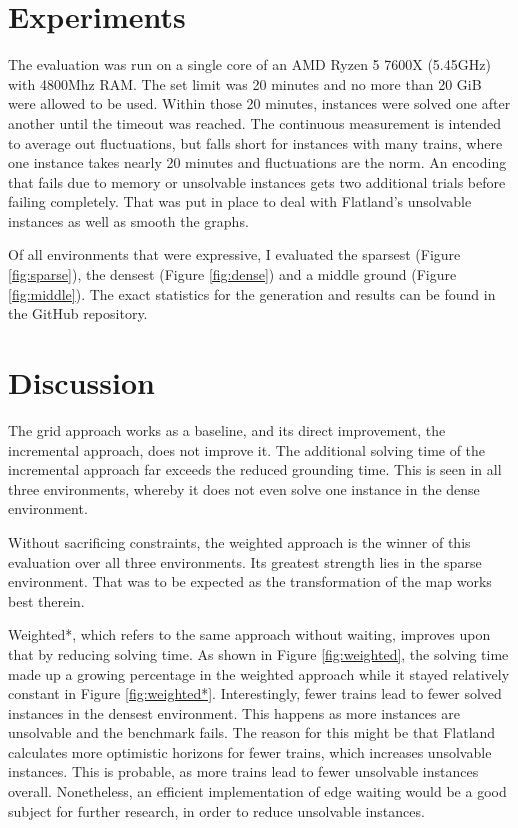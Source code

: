\documentclass{llncs}
\begin{document}
\begin{multicols*}{2}
\section*{Experiments}
The evaluation was run on a single core of an AMD Ryzen 5 7600X (5.45GHz) with 4800Mhz RAM. The set limit was 20 minutes and no more than 20 GiB were allowed to be used. Within those 20 minutes, instances were solved one after another until the timeout was reached. The continuous measurement is intended to average out fluctuations, but falls short for instances with many trains, where one instance takes nearly 20 minutes and fluctuations are the norm. An encoding that fails due to memory or unsolvable instances gets two additional trials before failing completely. That was put in place to deal with Flatland's unsolvable instances as well as smooth the graphs.

Of all environments that were expressive, I evaluated the sparsest (Figure \ref{fig:sparse}), the densest (Figure \ref{fig:dense}) and a middle ground (Figure \ref{fig:middle}). The exact statistics for the generation and results can be found in the GitHub repository. \cite{Git24}\\

\section*{Discussion}
The grid approach works as a baseline, and its direct improvement, the incremental approach, does not improve it. The additional solving time of the incremental approach far exceeds the reduced grounding time. This is seen in all three environments, whereby it does not even solve one instance in the dense environment.

Without sacrificing constraints, the weighted approach is the winner of this evaluation over all three environments. Its greatest strength lies in the sparse environment. That was to be expected as the transformation of the map works best therein.

Weighted*, which refers to the same approach without waiting, improves upon that by reducing solving time. As shown in Figure \ref{fig:weighted}, the solving time made up a growing percentage in the weighted approach while it stayed relatively constant in Figure \ref{fig:weighted*}. Interestingly, fewer trains lead to fewer solved instances in the densest environment. This happens as more instances are unsolvable and the benchmark fails. The reason for this might be that Flatland calculates more optimistic horizons for fewer trains, which increases unsolvable instances. This is probable, as more trains lead to fewer unsolvable instances overall. Nonetheless, an efficient implementation of edge waiting would be a good subject for further research, in order to reduce unsolvable instances.


\end{multicols*}
\end{document}
